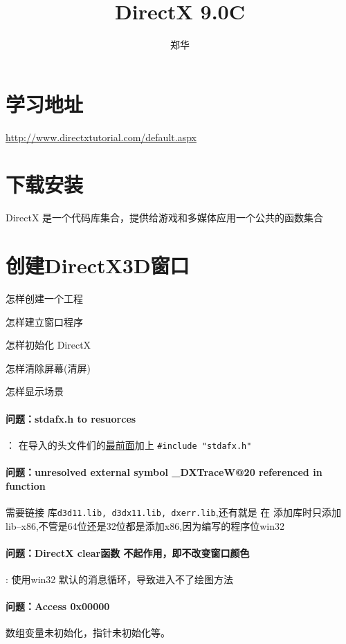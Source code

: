 \documentclass[UTF8,a4paper,8pt]{ctexart}
\author{郑华}
\title{DirectX 9.0C}
\begin{document}
 
 	\maketitle
	\tableofcontents
 \newpage
 \section{学习地址}\url{http://www.directxtutorial.com/default.aspx}
 
 \section{下载安装}
  DirectX 是一个代码库集合，提供给游戏和多媒体应用一个公共的函数集合
  
 \section{创建DirectX3D窗口}
 
	 怎样创建一个工程
	 
	 怎样建立窗口程序
	 
	 怎样初始化 DirectX
	 
	 怎样清除屏幕(清屏)
	 
	 怎样显示场景
 
	 \paragraph{问题：stdafx.h  to resuorces }：
		 在导入的头文件们的\underline{最前面}加上
		 \verb|#include "stdafx.h"|
	 \paragraph{问题：unresolved external symbol \_DXTraceW@20 referenced in function}
		 需要链接 库\verb|d3d11.lib, d3dx11.lib, dxerr.lib|,还有就是
		 在 添加库时只添加 lib--x86,不管是64位还是32位都是添加x86,因为编写的程序位win32
 
	 \paragraph{问题：DirectX clear函数 不起作用，即不改变窗口颜色}:
		 使用win32 默认的消息循环，导致进入不了绘图方法
	 
	 \paragraph{问题：Access 0x00000} 
		 数组变量未初始化，指针未初始化等。
 
\end{document}
